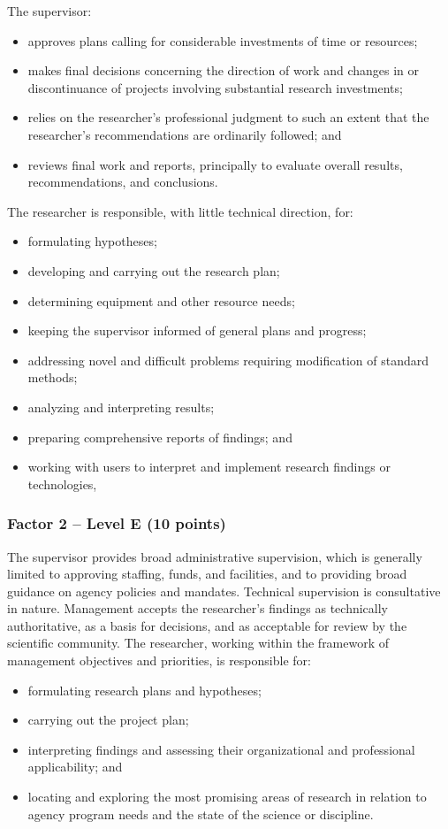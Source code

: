 The supervisor:
\begin{itemize}
  \item approves plans calling for considerable investments of time or resources;
  \item makes final decisions concerning the direction of work and changes in or discontinuance of projects involving substantial research investments;
  \item relies on the researcher's professional judgment to such an extent that the researcher's recommendations are ordinarily followed; and
  \item  reviews final work and reports, principally to evaluate overall results, recommendations, and conclusions.
\end{itemize}

The researcher is responsible, with little technical direction, for: 
\begin{itemize}
  \item formulating hypotheses;
  \item developing and carrying out the research plan;
  \item determining equipment and other resource needs;
  \item keeping the supervisor informed of general plans and progress;
  \item addressing novel and difficult problems requiring modification of standard methods;
  \item analyzing and interpreting results;
  \item preparing comprehensive reports of findings; and
  \item working with users to interpret and implement research findings or technologies,
\end{itemize}


\subsubsection*{Factor 2 -- Level E (10 points)}

The supervisor provides broad administrative supervision, which is
generally limited to approving staffing, funds, and facilities, and
to providing broad guidance on agency policies and mandates.
Technical supervision is consultative in nature.
Management accepts the researcher's findings as technically
authoritative, as a basis for decisions, and as acceptable for review
by the scientific community.
The researcher, working within the framework of management objectives
and priorities, is responsible for:
\begin{itemize}
  \item formulating research plans and hypotheses; 
  \item carrying out the project plan; 
  \item interpreting findings and assessing their organizational and professional applicability; and 
  \item locating and exploring the most promising areas of research in relation to agency program needs and the state of the science or discipline.
\end{itemize}